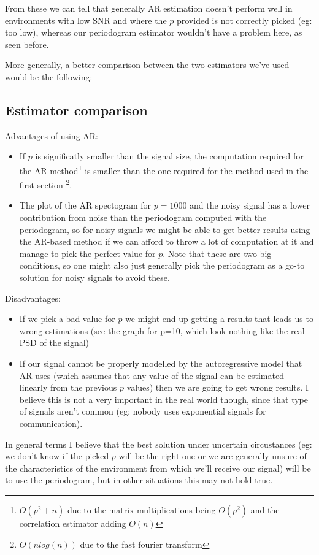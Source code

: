 \documentclass[conference,9pt]{IEEEtran}
\begin{document}
From these we can tell that generally AR estimation doesn't perform well in environments with low SNR and where the $p$ provided is not correctly picked (eg: too low), whereas our periodogram estimator wouldn't have a problem here, as seen before.

More generally, a better comparison between the two estimators we've used would be the following:

\subsection{Estimator comparison}
Advantages of using AR:
\begin{itemize}
  \item If $p$ is significatly smaller than the signal size, the computation required for the AR method\footnote{$O(p^2+n)$ due to the matrix multiplications being $O(p^2)$ and the correlation estimator adding $O(n)$} is smaller than the one required for the method used in the first section \footnote{$O(nlog(n))$ due to the fast fourier transform}.
  \item The plot of the AR spectogram for $p=1000$ and the noisy signal has a lower contribution from noise than the periodogram computed with the periodogram, so for noisy signals we might be able to get better results using the AR-based method if we can afford to throw a lot of computation at it and manage to pick the perfect value for $p$. Note that these are two big conditions, so one might also just generally pick the periodogram as a go-to solution for noisy signals to avoid these.
\end{itemize}

Disadvantages:
\begin{itemize}
  \item If we pick a bad value for $p$ we might end up getting a results that leads us to wrong estimations (see the graph for p=10, which look nothing like the real PSD of the signal)
  \item If our signal cannot be properly modelled by the autoregressive model that AR uses (which assumes that any value of the signal can be estimated linearly from the previous $p$ values) then we are going to get wrong results. I believe this is not a very important in the real world though, since that type of signals aren't common (eg: nobody uses exponential signals for communication).
\end{itemize}

In general terms I believe that the best solution under uncertain circustances (eg: we don't know if the picked $p$ will be the right one or we are generally unsure of the characteristics of the environment from which we'll receive our signal) will be to use the periodogram, but in other situations this may not hold true.
\end{document}
